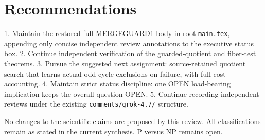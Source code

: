 \documentclass{article}
\begin{document}
\section{Recommendations}
1. Maintain the restored full MERGEGUARD1 body in root \texttt{main.tex}, appending only concise independent review annotations to the executive status box.
2. Continue independent verification of the guarded-quotient and fiber-test theorems.
3. Pursue the suggested next assignment: source-retained quotient search that learns actual odd-cycle exclusions on failure, with full cost accounting.
4. Maintain strict status discipline: one OPEN load-bearing implication keeps the overall question OPEN.
5. Continue recording independent reviews under the existing \texttt{comments/grok-4.7/} structure.

No changes to the scientific claims are proposed by this review. All classifications remain as stated in the current synthesis. P versus NP remains open.
\end{document}
